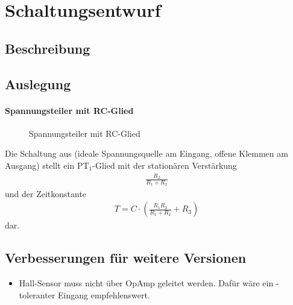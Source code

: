 
\chapter{Schaltungsentwurf}


\section{Beschreibung}


\section{Auslegung}



\subsubsection{Spannungsteiler mit RC-Glied}

\begin{figure}[htb]%
	\centering
	\caption{Spannungsteiler mit RC-Glied}%
	\label{fig:VDivRC}%
\end{figure}		

Die Schaltung aus  (ideale Spannungsquelle am Eingang, offene Klemmen am Ausgang) stellt ein PT$_1$-Glied mit der stationären Verstärkung
\begin{align*}
	\frac{R_2}{R_1 + R_2}
\end{align*}
und der Zeitkonstante
\begin{align*}
	T = C \cdot \left( \frac{R_1 R_2}{R_1 + R_2} + R_3 \right)
\end{align*}
dar.



\section{Verbesserungen für weitere Versionen}

\begin{itemize}
	\item Hall-Sensor muss nicht über OpAmp geleitet werden. Dafür wäre ein -toleranter Eingang empfehlenswert.
\end{itemize}




